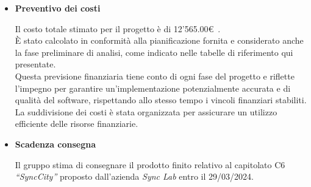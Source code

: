 \documentclass{article}
\begin{document}
\begin{itemize}
    \item[] \textbf{\fontsize{12}{6}\selectfont Preventivo dei costi} 

    Il costo totale stimato per il progetto è di 12'565.00\euro\ . \\ 
    È stato calcolato in conformità alla pianificazione fornita e considerato anche la fase preliminare di analisi, come indicato nelle tabelle di riferimento qui presentate.\\
    Questa previsione finanziaria tiene conto di ogni fase del progetto e riflette l’impegno per garantire un’implementazione potenzialmente accurata e di qualità del software, rispettando allo stesso tempo i vincoli finanziari stabiliti. La suddivisione dei costi è stata organizzata per assicurare un utilizzo efficiente delle risorse finanziarie. 

    \vspace{0.5cm}

    \item[] \textbf{\fontsize{12}{6}\selectfont Scadenza consegna} 

    Il gruppo stima di consegnare il prodotto finito relativo al capitolato C6 \textit{“SyncCity”} proposto dall’azienda \textit{Sync Lab} entro il 29/03/2024.
\end{itemize}
\end{document}

